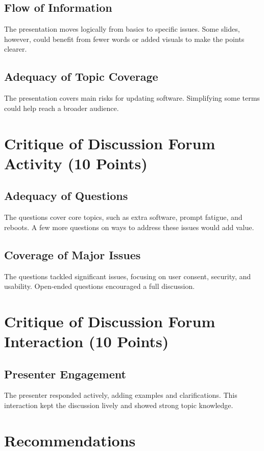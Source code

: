 \documentclass{article}
\begin{document}
\subsection*{Flow of Information}
The presentation moves logically from basics to specific issues. Some slides, however, could benefit from fewer words or added visuals to make the points clearer.

\subsection*{Adequacy of Topic Coverage}
The presentation covers main risks for updating software. Simplifying some terms could help reach a broader audience.

\section*{Critique of Discussion Forum Activity (10 Points)}

\subsection*{Adequacy of Questions}
The questions cover core topics, such as extra software, prompt fatigue, and reboots. A few more questions on ways to address these issues would add value.

\subsection*{Coverage of Major Issues}
The questions tackled significant issues, focusing on user consent, security, and usability. Open-ended questions encouraged a full discussion.

\section*{Critique of Discussion Forum Interaction (10 Points)}

\subsection*{Presenter Engagement}
The presenter responded actively, adding examples and clarifications. This interaction kept the discussion lively and showed strong topic knowledge.

\section*{Recommendations}
\end{document}
